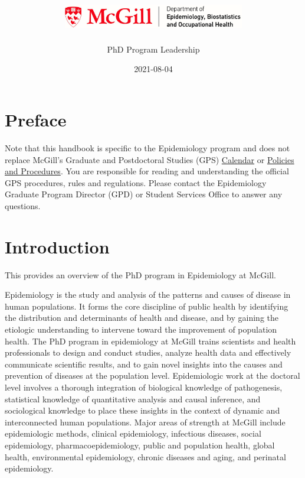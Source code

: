 \documentclass[
]{book}
\title{\includegraphics[width=3.125in,height=\textheight]{mcgill-epi-logo.png}}
\author{PhD Program Leadership}
\date{2021-08-04}
\begin{document}
\maketitle

{
\setcounter{tocdepth}{1}
\tableofcontents
}
\hypertarget{preface}{%
\chapter*{Preface}\label{preface}}

Note that this handbook is specific to the Epidemiology program and does not replace McGill's Graduate and Postdoctoral Studies (GPS) \href{https://www.mcgill.ca/students/courses/calendars/}{Calendar} or \href{https://www.mcgill.ca/gps/students/policies-and-guidelines}{Policies and Procedures}. You are responsible for reading and understanding the official GPS procedures, rules and regulations. Please contact the Epidemiology Graduate Program Director (GPD) or Student Services Office to answer any questions.

\hypertarget{introduction}{%
\chapter{Introduction}\label{introduction}}

This provides an overview of the PhD program in Epidemiology at McGill.

Epidemiology is the study and analysis of the patterns and causes of disease in human populations. It forms the core discipline of public health by identifying the distribution and determinants of health and disease, and by gaining the etiologic understanding to intervene toward the improvement of population health. The PhD program in epidemiology at McGill trains scientists and health professionals to design and conduct studies, analyze health data and effectively communicate scientific results, and to gain novel insights into the causes and prevention of diseases at the population level. Epidemiologic work at the doctoral level involves a thorough integration of biological knowledge of pathogenesis, statistical knowledge of quantitative analysis and causal inference, and sociological knowledge to place these insights in the context of dynamic and interconnected human populations. Major areas of strength at McGill include epidemiologic methods, clinical epidemiology, infectious diseases, social epidemiology, pharmacoepidemiology, public and population health, global health, environmental epidemiology, chronic diseases and aging, and perinatal epidemiology.
\end{document}
